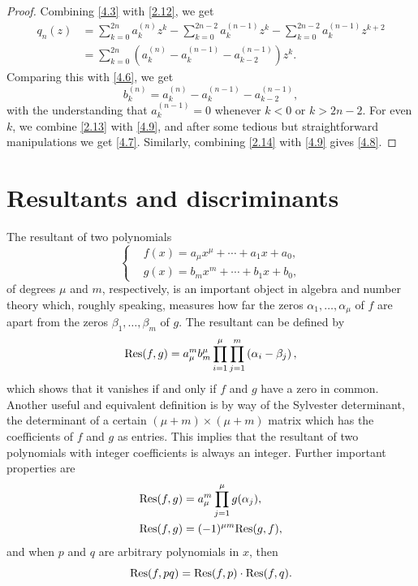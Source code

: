 \documentclass{amsart}
\theoremstyle{plain}
\numberwithin{equation}{section}
\begin{document}
\begin{proof}
Combining \eqref{4.3} with \eqref{2.12}, we get 
\begin{align*}
q_n(z)&=\sum_{k=0}^{2n}a_k^{(n)}z^k-\sum_{k=0}^{2n-2}a_k^{(n-1)}z^k
-\sum_{k=0}^{2n-2}a_k^{(n-1)}z^{k+2} \\
&= \sum_{k=0}^{2n}\left(a_k^{(n)}-a_k^{(n-1)}-a_{k-2}^{(n-1)}\right)z^k.
\end{align*}
Comparing this with \eqref{4.6}, we get
\begin{equation}\label{4.9}
b_k^{(n)} = a_k^{(n)}-a_k^{(n-1)}-a_{k-2}^{(n-1)},
\end{equation}
with the understanding that $a_k^{(n-1)}=0$ whenever $k<0$ or $k>2n-2$. For even
$k$, we combine \eqref{2.13} with \eqref{4.9}, and after some tedious but
straightforward manipulations we get \eqref{4.7}. Similarly, combining
\eqref{2.14} with \eqref{4.9} gives \eqref{4.8}.
\end{proof}

\section{Resultants and discriminants}\label{sec:5}

The resultant of two polynomials
\begin{equation}\label{5.1}
\begin{cases}
&f(x)=a_\mu x^\mu+\cdots+a_1x+a_0,\\
&g(x)=b_m x^m+\cdots+b_1x+b_0,
\end{cases}
\end{equation}
of degrees $\mu$ and $m$, respectively, is an important object in algebra and
number theory which, roughly speaking, measures how far the zeros
$\alpha_1,\ldots, \alpha_\mu$ of $f$ are apart from the zeros
$\beta_1,\ldots, \beta_m$ of $g$. The resultant can be defined by
\[
{\rm Res}(f,g)=a_{\mu}^mb_m^{\mu}\prod_{i=1}^{\mu}
\prod_{j=1}^m\left(\alpha_i-\beta_j\right),
\]
which shows that it vanishes if and only if $f$ and $g$ have a 
zero in common. Another useful and equivalent definition is by way of the
Sylvester determinant, the determinant of a certain $(\mu+m)\times(\mu+m)$
matrix which has the coefficients of $f$ and $g$ as entries. This implies
that the resultant of two polynomials with integer coefficients is always an
integer. Further important properties are 
\begin{align}
{\rm Res}(f,g) &= a_{\mu}^m\prod_{j=1}^\mu g(\alpha_j),\label{5.3}\\
{\rm Res}(f,g) &= (-1)^{\mu m}{\rm Res}(g,f),\label{5.4}
\end{align}
and when $p$ and $q$ are arbitrary polynomials in $x$, then
\begin{equation}\label{5.5}
{\rm Res}(f,pq) = {\rm Res}(f,p)\cdot {\rm Res}(f,q).
\end{equation}
\end{document}
